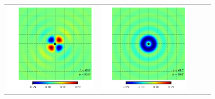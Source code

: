 \documentclass[a4paper,11pt]{article}
\begin{document}
\begin{figure}[t]
\begin{center}
\begin{tabular}{m{8ex}m{}m{}|m{}m{}}
\hspace{\kernelfigspace}\includegraphics[width=\kernelfigwidth]{qu2eb_iker_rad_lat90_lon45.pdf} &
\hspace{\kernelfigspace}\includegraphics[width=\kernelfigwidth]{qu2eb_rker_con_lat90_lon45.pdf} &

\end{tabular}
\end{center}
\end{figure}
\end{document}
